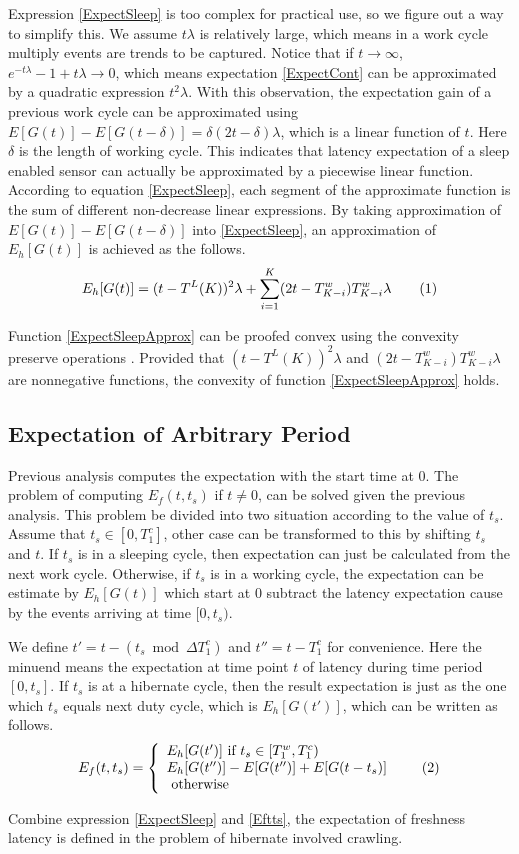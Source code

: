 \documentclass[conference]{IEEEtran}
\newcommand\numberthis{\addtocounter{equation}{1}\tag{\theequation}}
\begin{document}
Expression \eqref{ExpectSleep} is too complex for practical use, so we figure out a way to simplify this. 
We assume $t\lambda$ is relatively large, which means in a work cycle multiply events are trends to be captured.
Notice that if $t\rightarrow \infty$, $e^{-t\lambda}-1+t \lambda \rightarrow 0$, which means expectation \eqref{ExpectCont} can be approximated by a quadratic expression $t^2\lambda$.
With this observation, the expectation gain of a previous work cycle can be approximated using $E[G(t)]-E[G(t-\delta)] = \delta (2 t - \delta)\lambda$, which is a linear function of $t$. Here $\delta$ is the length of working cycle.
This indicates that latency expectation of a sleep enabled sensor can actually be approximated by a piecewise linear function.
According to equation \eqref{ExpectSleep}, each segment of the approximate function is the sum of different non-decrease linear expressions.
By taking approximation of $E[G(t)]-E[G(t-\delta)]$ into \eqref{ExpectSleep}, an approximation of $E_h[G(t)]$ is achieved as the follows.
\begin{align*}
E_h[G(t)] = (t-T^{L}(K))^2\lambda + \sum_{i=1}^{K} (2 t - T^{w}_{K-i})T^{w}_{K-i}\lambda
\numberthis 
\label{ExpectSleepApprox}
\end{align*}

Function \eqref{ExpectSleepApprox} can be proofed convex using the convexity preserve operations \cite{boyd2004convex}. Provided that $(t-T^{L}(K))^2\lambda$ and $(2 t - T^{w}_{K-i})T^{w}_{K-i}\lambda$ are nonnegative functions, the convexity of function \eqref{ExpectSleepApprox} holds.

\subsection{Expectation of Arbitrary Period}
Previous analysis computes the expectation with the start time at $0$. The problem of computing $E_f(t,t_s)$ if $t\ne0$, can be solved given the previous analysis. This problem be divided into two situation according to the value of $t_s$.
Assume that $t_s\in [0,T^{c}_{1}]$, other case can be transformed to this by shifting $t_s$ and $t$.
If $t_s$ is in a sleeping cycle, then expectation can just be calculated from the next work cycle.
Otherwise, if $t_s$ is in a working cycle, the expectation can be estimate by $E_h[G(t)]$ which start at $0$ subtract the latency expectation cause by the events arriving at time $[0, t_s)$.

We define $t'=t-(t_s\bmod\Delta T^{c}_{1})$ and $t''=t-T^{c}_{1}$ for convenience. 
Here the minuend means the expectation at time point $t$ of latency during time period $[0, t_s]$.
If $t_s$ is at a hibernate cycle, then the result expectation is just as the one which $t_s$ equals next duty cycle, which is $E_h[G(t')]$, which can be written as follows.
\[E_f(t,t_s)=\left\{
    \begin{array}{lr}
    E_h[G(t')]\text{ if } t_s\in [T^{w}_{1}, T^{c}_{1})\\
    E_h[G(t'')]-E[G(t'')]+E[G(t-t_s)]\\
    \text{ otherwise }
    \end{array}\numberthis \label{Eftts}
    \right.
\]

Combine expression \eqref{ExpectSleep} and \eqref{Eftts}, the expectation of freshness latency is defined in the problem of hibernate involved crawling.
\end{document}

